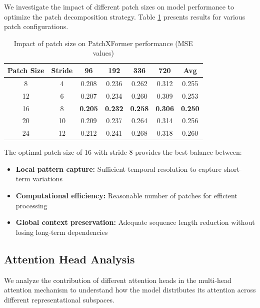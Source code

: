 \documentclass[12pt]{uomthesis}
\begin{document}
We investigate the impact of different patch sizes on model performance to optimize the patch decomposition strategy. Table \ref{tab:patch_size_analysis} presents results for various patch configurations.

\begin{table}[h]
\centering
\caption{Impact of patch size on PatchXFormer performance (MSE values)}
\begin{tabular}{ccccccc}
\toprule
\textbf{Patch Size} & \textbf{Stride} & \textbf{96} & \textbf{192} & \textbf{336} & \textbf{720} & \textbf{Avg} \\
\midrule
8 & 4 & 0.208 & 0.236 & 0.262 & 0.312 & 0.255 \\
12 & 6 & 0.207 & 0.234 & 0.260 & 0.309 & 0.253 \\
16 & 8 & \textbf{0.205} & \textbf{0.232} & \textbf{0.258} & \textbf{0.306} & \textbf{0.250} \\
20 & 10 & 0.209 & 0.237 & 0.264 & 0.314 & 0.256 \\
24 & 12 & 0.212 & 0.241 & 0.268 & 0.318 & 0.260 \\
\bottomrule
\end{tabular}
\label{tab:patch_size_analysis}
\end{table}

The optimal patch size of 16 with stride 8 provides the best balance between:
\begin{itemize}
\item \textbf{Local pattern capture:} Sufficient temporal resolution to capture short-term variations
\item \textbf{Computational efficiency:} Reasonable number of patches for efficient processing
\item \textbf{Global context preservation:} Adequate sequence length reduction without losing long-term dependencies
\end{itemize}

\subsection{Attention Head Analysis}

We analyze the contribution of different attention heads in the multi-head attention mechanism to understand how the model distributes its attention across different representational subspaces.
\end{document}
